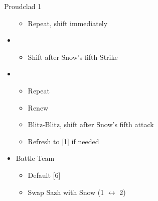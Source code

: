 \begin{battle}[1:31]{Proudclad 1}
\begin{itemize}
		      \begin{itemize}
			      \item Repeat, shift immediately
		      \end{itemize}
		\item \sixth
		      \begin{itemize}
			      \item Shift after Snow's fifth Strike
		      \end{itemize}
		\item \second
		      \begin{itemize}
			      \item Repeat
			      \item Renew
			      \item Blitz-Blitz, shift after Snow's fifth attack
			      \item Refresh to [1] if needed
		      \end{itemize}
	\end{itemize}
\end{battle}
\vfill
\begin{menu}
	\begin{itemize}
		\paradigm
		\begin{itemize}
			\item Battle Team
				\begin{itemize}
					\item Default [6]
					\item Swap Sazh with Snow (1 $\leftrightarrow$ 2)
				\end{itemize}
		\end{itemize}
	\end{itemize}
\end{menu}

